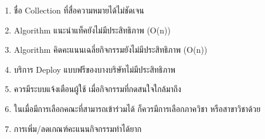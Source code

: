\begin{enumerate}
    \item ชื่อ Collection ที่สื่อความหมายได้ไม่ชัดเจน
    \item Algorithm แนะนำแท็คยังไม่มีประสิทธิภาพ (O(n))
    \item Algorithm คิดคะแนนเฉลี่ยกิจกรรมยังไม่มีประสิทธิภาพ (O(n))
    \item บริการ Deploy แบบฟรีของบางบริษัทไม่มีประสิทธิภาพ
    \item ควรมีระบบแจ้งเตือนผู้ใช้ เมื่อกิจกรรมที่กดสนใจใกล้มาถึง
    \item ในเมื่อมีการเลือกคณะที่สามารถเข้าร่วมได้ ก็ควรมีการเลือกภาควิชา หรือสาขาวิชาด้วย
    \item การเพิ่ม/ลดเกณฑ์คะแนนกิจกรรมทำได้ยาก
\end{enumerate}
